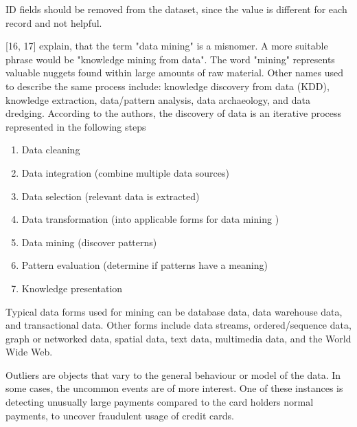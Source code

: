 ID fields should be removed from the dataset, since the value is different for each record and not helpful.







\textcite{han2011data}[16, 17] explain, that the term "data mining" is a misnomer. A more suitable phrase would be "knowledge mining from data". The word "mining" represents valuable nuggets found within large amounts of raw material. Other names used to describe the same process include: knowledge discovery from data (KDD), knowledge extraction, data/pattern analysis, data archaeology, and data dredging.
According to the authors, the discovery of data is an iterative process represented in the following steps

\begin{enumerate}
  \item Data cleaning
  \item Data integration (combine multiple data sources)
  \item Data selection (relevant data is extracted)
  \item Data transformation (into applicable forms for data mining )
  \item Data mining (discover patterns)
  \item Pattern evaluation (determine if patterns have a meaning)
  \item Knowledge presentation
\end{enumerate}

Typical data forms used for mining can be database data, data warehouse data, and transactional data. Other forms include data streams, ordered/sequence data, graph or networked data, spatial data, text data, multimedia data, and the World Wide Web.

Outliers are objects that vary to the general behaviour or model of the data. In some cases, the uncommon events are of more interest. One of these instances is detecting unusually large payments compared to the card holders normal payments, to uncover fraudulent usage of credit cards.